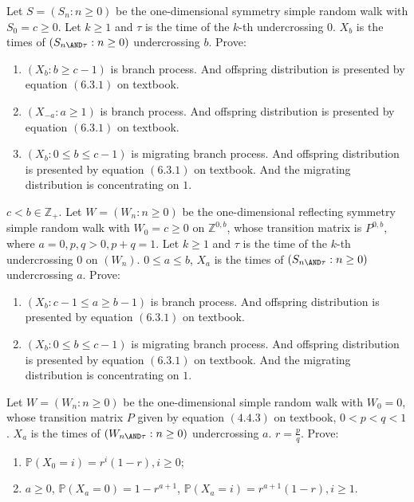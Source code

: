 \documentclass{ctexart}
\newif\ifpreface
\begin{document}
\large
\setlength{\baselineskip}{1.2em}
\ifpreface
  
\else
\fi
{}
\begin{problem}\label{pro:1}
  Let \(S=(S_n:n \geq 0)\) be the one-dimensional symmetry simple random walk with \(S_0=c \geq 0\).
  Let \(k \geq 1\) and \(\tau\) is the time of the \(k\)-th undercrossing \(0\).
  \(X_b\) is the times of \((S_{n \AND \tau}:n \geq 0)\) undercrossing \(b\). Prove:
  \begin{enumerate}
    \item \((X_b:b \geq c-1)\) is branch process. And offspring distribution is presented by equation \((6.3.1)\) on textbook.
    \item \((X_{-a}:a \geq 1)\) is branch process. And offspring distribution is presented by equation \((6.3.1)\) on textbook.
    \item \((X_b:0 \leq b \leq c-1)\) is migrating branch process. And offspring distribution is presented by equation \((6.3.1)\) on textbook.
      And the migrating distribution is concentrating on \(1\).
  \end{enumerate}
\end{problem}
\begin{problem}\label{pro:2}
  \(c < b \in \mathbb{Z}_+\). Let \(W=(W_n :n \geq 0)\) be the one-dimensional reflecting symmetry simple
  random walk with \(W_0=c \geq 0\) on \(\mathbb{Z}^{0,b}\), whose transition matrix is \(P^{0,b}\), where
  \(a = 0,p,q >0, p + q =1\).
  Let \(k \geq 1\) and \(\tau\) is the time of the \(k\)-th undercrossing \(0\) on \((W_n)\).
  \(0 \leq a \leq b\),
  \(X_a\) is the times of \((S_{n \AND \tau}:n \geq 0)\) undercrossing \(a\). Prove:
  \begin{enumerate}
    \item \((X_b:c-1 \leq a \geq b-1)\) is branch process. And offspring distribution is presented by equation \((6.3.1)\) on textbook.
    \item \((X_b:0 \leq b \leq c-1)\) is migrating branch process. And offspring distribution is presented by equation \((6.3.1)\) on textbook.
      And the migrating distribution is concentrating on \(1\).
  \end{enumerate}
\end{problem}
\begin{problem}\label{pro:3}
  Let \(W=(W_n:n \geq 0)\) be the one-dimensional simple random walk with \(W_0=0\), whose transition matrix \(P\) given by equation \((4.4.3)\)
  on textbook, \(0< p<q<1\).
  \(X_a\) is the times of \((W_{n \AND \tau}:n \geq 0)\) undercrossing \(a\).
  \(r=\frac{p}{q}\).
  Prove:
  \begin{enumerate}
    \item \(\mathbb{P}(X_0=i)=r^i(1-r),i \geq 0\);
    \item \(a \geq 0\), \(\mathbb{P}(X_a=0)=1-r^{a +1}\), \(\mathbb{P}(X_a=i)=r^{a + 1}(1 -r),i \geq 1\).
  \end{enumerate}
\end{problem}
\end{document}
